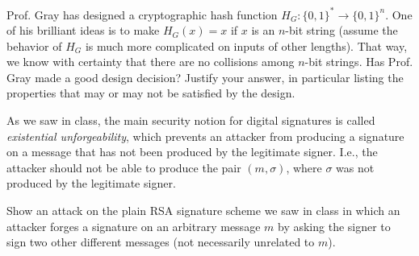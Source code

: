 \documentclass[12pt,addpoints,answers]{exam}
\begin{document}
\begin{questions}

\newpage

\question[10] Prof. Gray has designed a cryptographic hash function $H_G : \{0, 1\}^\ast \rightarrow \{0, 1\}^n$. One of his brilliant ideas is to make $H_G(x) = x$ if $x$ is an $n$-bit string (assume the behavior of $H_G$ is much more complicated on inputs of other lengths). That way, we know with certainty that there are no collisions among $n$-bit strings. Has Prof. Gray made a good design decision? Justify your answer, in particular listing the properties that may or may not be satisfied by the design.

    

\newpage

\question[10] As we saw in class, the main security notion for digital signatures is called {\em existential unforgeability}, which prevents an attacker from producing a signature on a message that has not been produced by the legitimate signer. I.e., the attacker should not be able to produce the pair $(m, \sigma)$, where $\sigma$ was not produced by the legitimate signer. 

Show an attack on the plain RSA signature scheme we saw in class in which an attacker forges a signature on an arbitrary message $m$ by asking the signer to sign two other different messages (not necessarily unrelated to $m$).


\end{questions}
\end{document}
